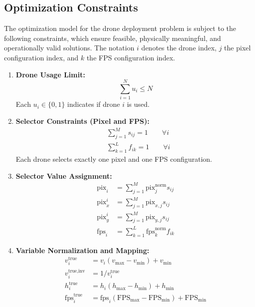 \subsection{Optimization Constraints}\label{sec:optimizer-constraints}

The optimization model for the drone deployment problem is subject to the following constraints, which ensure feasible, physically meaningful, and operationally valid solutions. The notation $i$ denotes the drone index, $j$ the pixel configuration index, and $k$ the FPS configuration index.

\begin{enumerate}
    \item \textbf{Drone Usage Limit:}
    \begin{equation}
        \sum_{i=1}^{N} u_i \leq N
    \end{equation}
    Each $u_i \in \{0,1\}$ indicates if drone $i$ is used.

    \item \textbf{Selector Constraints (Pixel and FPS):}
    \begin{align}
        &\sum_{j=1}^{M} s_{ij} = 1 \qquad \forall i \\
        &\sum_{k=1}^{L} f_{ik} = 1 \qquad \forall i
    \end{align}
    Each drone selects exactly one pixel and one FPS configuration.

    \item \textbf{Selector Value Assignment:}
    \begin{align}
        \text{pix}_i &= \sum_{j=1}^{M} \text{pix}_j^{\text{norm}} s_{ij} \\
        \text{pix}_x^i &= \sum_{j=1}^{M} \text{pix}_{x,j} s_{ij} \\
        \text{pix}_y^i &= \sum_{j=1}^{M} \text{pix}_{y,j} s_{ij} \\
        \text{fps}_i &= \sum_{k=1}^{L} \text{fps}_k^{\text{norm}} f_{ik}
    \end{align}

    \item \textbf{Variable Normalization and Mapping:}
    \begin{align}
        v_i^{\text{true}} &= v_i (v_{\max} - v_{\min}) + v_{\min} \\
        v_i^{\text{true,inv}} &= 1 / v_i^{\text{true}} \\
        h_i^{\text{true}} &= h_i (h_{\max} - h_{\min}) + h_{\min} \\
        \text{fps}_i^{\text{true}} &= \text{fps}_i (\text{FPS}_{\max} - \text{FPS}_{\min}) + \text{FPS}_{\min}
    \end{align}


\end{enumerate}
